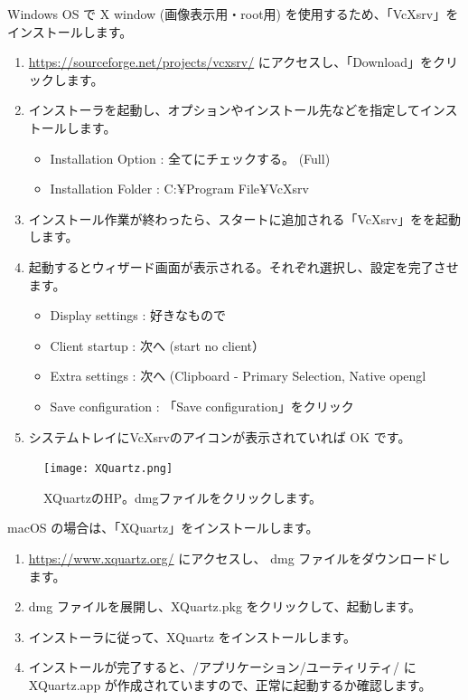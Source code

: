 \documentclass[uplatex,10pt,a4j]{jsarticle}
\begin{document}
Windows OS で X window (画像表示用・root用) を使用するため、「VcXsrv」をインストールします。
\begin{enumerate}
  \item \url{https://sourceforge.net/projects/vcxsrv/} にアクセスし、「Download」をクリックします。
  \item インストーラを起動し、オプションやインストール先などを指定してインストールします。
        \begin{itemize}
          \item Installation Option : 全てにチェックする。 (Full)
          \item Installation Folder : C:¥Program File¥VcXsrv
        \end{itemize}
  \item インストール作業が終わったら、スタートに追加される「VcXsrv」をを起動します。
  \item 起動するとウィザード画面が表示される。それぞれ選択し、設定を完了させます。
        \begin{itemize}
          \item Display settings : 好きなもので
          \item Client startup : 次へ (start no client）
          \item Extra settings : 次へ (Clipboard - Primary Selection, Native opengl
          \item Save configuration : 「Save configuration」をクリック
        \end{itemize}
  \item システムトレイにVcXsrvのアイコンが表示されていれば OK です。
\end{enumerate}
\begin{figure}[h]
  \begin{center}
    \texttt{[image: XQuartz.png]}
    \caption{XQuartzのHP。dmgファイルをクリックします。}
  \end{center}
\end{figure}
macOS の場合は、「XQuartz」をインストールします。
\begin{enumerate}
  \item \url{https://www.xquartz.org/} にアクセスし、 dmg ファイルをダウンロードします。
  \item dmg ファイルを展開し、XQuartz.pkg をクリックして、起動します。
  \item インストーラに従って、XQuartz をインストールします。
  \item インストールが完了すると、/アプリケーション/ユーティリティ/ に XQuartz.app が作成されていますので、正常に起動するか確認します。
\end{enumerate}
\end{document}
